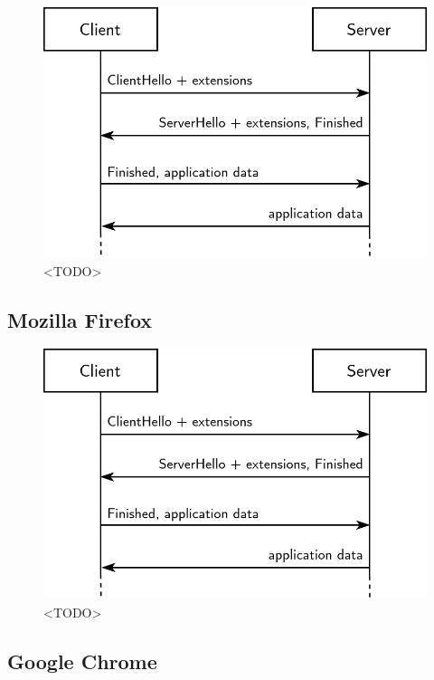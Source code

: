 \blindtext

\begin{figure}[ht]
\centerline{\includegraphics[width=120mm]{images/tls-handshake.png}}
\caption[Screenshot of curl output when accessing tcd.example.com]{<TODO>}
\label{curl_screenshot_figure}
\end{figure}

\subsection{Mozilla Firefox}

\blindtext

\begin{figure}[ht]
\centerline{\includegraphics[width=120mm]{images/tls-handshake.png}}
\caption[Screenshot of Mozilla Firefox when accessing tcd.example.com]{<TODO>}
\label{firefox_screenshot_figure}
\end{figure}

\subsection{Google Chrome}

